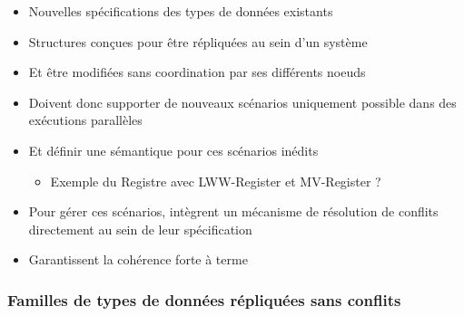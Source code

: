 \documentclass[12pt]{thesul}
\begin{document}
\begin{itemize}
  \item Nouvelles spécifications des types de données existants
  \item Structures conçues pour être répliquées au sein d'un système
  \item Et être modifiées sans coordination par ses différents noeuds
  \item Doivent donc supporter de nouveaux scénarios uniquement possible dans des exécutions parallèles
  \item Et définir une sémantique pour ces scénarios inédits
  \begin{itemize}
    \item Exemple du Registre avec LWW-Register et MV-Register ?
  \end{itemize}
  \item Pour gérer ces scénarios, intègrent un mécanisme de résolution de conflits directement au sein de leur spécification
  \item Garantissent la cohérence forte à terme
\end{itemize}

\subsubsection{Familles de types de données répliquées sans conflits}
\end{document}
